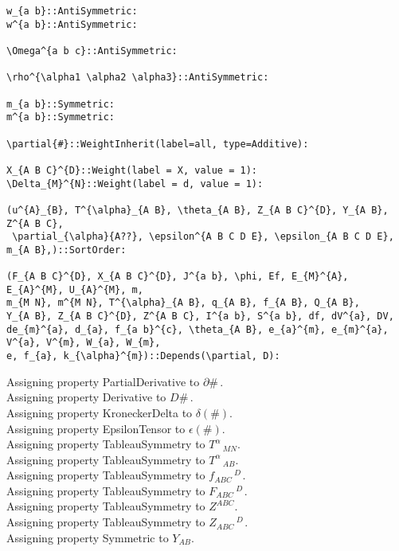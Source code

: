 \documentclass[11pt]{article}
\begin{document}
{\begin{verbatim}
w_{a b}::AntiSymmetric:
w^{a b}::AntiSymmetric:

\Omega^{a b c}::AntiSymmetric:

\rho^{\alpha1 \alpha2 \alpha3}::AntiSymmetric:

m_{a b}::Symmetric:
m^{a b}::Symmetric:

\partial{#}::WeightInherit(label=all, type=Additive):

X_{A B C}^{D}::Weight(label = X, value = 1):
\Delta_{M}^{N}::Weight(label = d, value = 1):

(u^{A}_{B}, T^{\alpha}_{A B}, \theta_{A B}, Z_{A B C}^{D}, Y_{A B}, Z^{A B C},
 \partial_{\alpha}{A??}, \epsilon^{A B C D E}, \epsilon_{A B C D E}, m_{A B},)::SortOrder:

(F_{A B C}^{D}, X_{A B C}^{D}, J^{a b}, \phi, Ef, E_{M}^{A}, E_{A}^{M}, U_{A}^{M}, m,
m_{M N}, m^{M N}, T^{\alpha}_{A B}, q_{A B}, f_{A B}, Q_{A B},
Y_{A B}, Z_{A B C}^{D}, Z^{A B C}, I^{a b}, S^{a b}, df, dV^{a}, DV,
de_{m}^{a}, d_{a}, f_{a b}^{c}, \theta_{A B}, e_{a}^{m}, e_{m}^{a}, V^{a}, V^{m}, W_{a}, W_{m}, 
e, f_{a}, k_{\alpha}^{m})::Depends(\partial, D):
\end{verbatim}}
Assigning property PartialDerivative to $\partial{\#}\, $.
\\
Assigning property Derivative to $D{\#}\, $.
\\
Assigning property KroneckerDelta to $\delta(\#)$.
\\
Assigning property EpsilonTensor to $\epsilon(\#)$.
\\
Assigning property TableauSymmetry to ${T}^{\alpha}\,_{M N}$.
\\
Assigning property TableauSymmetry to ${T}^{\alpha}\,_{A B}$.
\\
Assigning property TableauSymmetry to ${f}_{A B C}\,^{D\, }$.
\\
Assigning property TableauSymmetry to ${F}_{A B C}\,^{D\, }$.
\\
Assigning property TableauSymmetry to ${Z}^{A B C}$.
\\
Assigning property TableauSymmetry to ${Z}_{A B C}\,^{D\, }$.
\\
Assigning property Symmetric to ${Y}_{A B}$.
\end{document}
